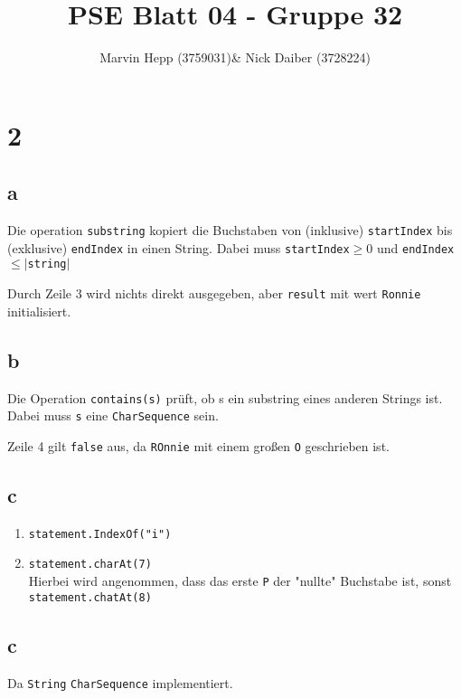\documentclass{article}
\title{PSE Blatt 04 - Gruppe 32}
\author{Marvin Hepp (3759031)\& Nick Daiber (3728224)}
\begin{document}
\section*{2}
\subsection*{a}
Die operation \verb|substring| kopiert die Buchstaben von 
(inklusive) \verb|startIndex| bis (exklusive) 
\verb|endIndex| in einen String.  Dabei muss 
\verb|startIndex|$\geq 0$ und
\verb|endIndex|$\leq |$\verb|string|$|$

Durch Zeile 3 wird nichts direkt ausgegeben, aber 
\verb|result| mit wert \verb|Ronnie| initialisiert.
\subsection*{b}
Die Operation \verb|contains(s)| prüft, ob s ein substring
eines anderen Strings ist. Dabei muss \verb|s| eine
\verb|CharSequence| sein.

Zeile 4 gilt \verb|false| aus, da \verb|ROnnie| mit einem 
großen \verb|O| geschrieben ist.
\subsection*{c}
\begin{enumerate}
    \item \verb|statement.IndexOf("i")|
    \item {\verb|statement.charAt(7)|\\
    Hierbei wird angenommen, dass das erste \verb|P| der
    "nullte" Buchstabe ist, sonst
    \verb|statement.chatAt(8)|}
\end{enumerate}
\subsection*{c}
Da \verb|String| \verb|CharSequence| implementiert.
\end{document}
